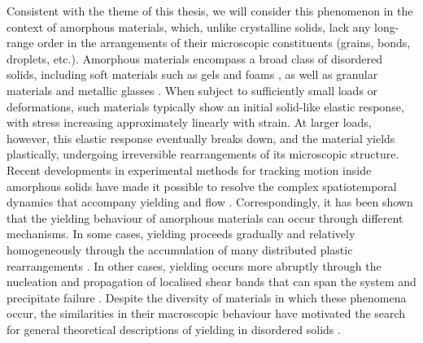 Consistent with the theme of this thesis, we will consider this phenomenon in the context of amorphous materials, which, unlike crystalline solids, lack any long-range order in the arrangements of their microscopic constituents (grains, bonds, droplets, etc.). Amorphous materials \cite{nicolas_deformation_2018,Berthier2011,Berthier2025} encompass a broad class of disordered solids, including soft materials such as gels and foams \cite{bonn_yield_2017}, as well as granular materials \cite{liuJammingNotJust1998} and metallic glasses \cite{SCHUH2007}. When subject to sufficiently small loads or deformations, such materials typically show an initial solid-like elastic response, with stress increasing approximately linearly with strain. At larger loads, however, this elastic response eventually breaks down, and the material yields plastically, undergoing irreversible rearrangements of its microscopic structure. Recent developments in experimental methods for tracking motion inside amorphous solids have made it possible to resolve the complex spatiotemporal dynamics that accompany yielding and flow \cite{porr_probing_2025,manneville_recent_2008,Besseling2009,Dutta2013,divoux_stress_2011,divouxTransientShearBanding2010,divoux_yielding_2012,grenard_timescales_2014,gibaud_heterogeneous_2010,kurokawa_avalanche-like_2015,Chan2013,Schott2025,Zhang2025,Shang2024,Aime2025}. Correspondingly, it has been shown that the yielding behaviour of amorphous materials can occur through different mechanisms. In some cases, yielding proceeds gradually and relatively homogeneously through the accumulation of many distributed plastic rearrangements \cite{Malandro1999,pollard_yielding_2022,falk_dynamics_1998,divoux_stress_2011,divoux_yielding_2012,divouxTransientShearBanding2010,grenard_timescales_2014,Gibaud2009,gibaud_heterogeneous_2010,kurokawa_avalanche-like_2015,Sentjabrskaja2015}. In other cases, yielding occurs more abruptly through the nucleation and propagation of localised shear bands that can span the system and precipitate failure \cite{divoux_stress_2011,pollard_yielding_2022,SCHUH2007,barlow_ductile_2020,Huang2016,bonnDelayedFractureInhomogeneous1998,leocmach_creep_2014,Tabuteau2009,fieldingTriggersSignaturesShear2016}. Despite the diversity of materials in which these phenomena occur, the similarities in their macroscopic behaviour have motivated the search for general theoretical descriptions of yielding in disordered solids \cite{cabriolu_precursors_2019}. 

